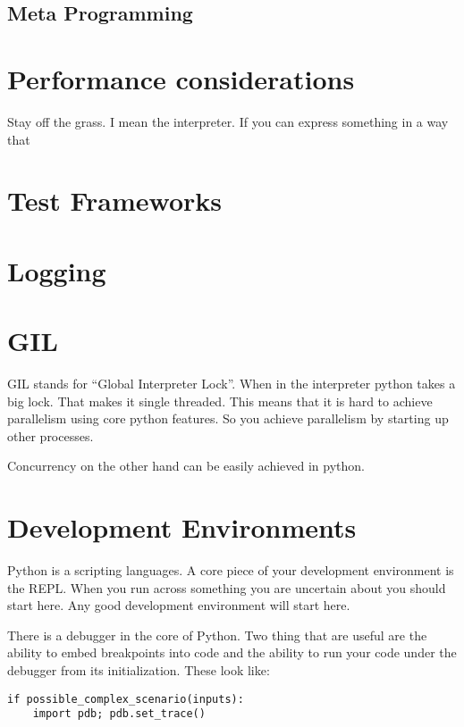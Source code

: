 \documentclass[]{article}
\begin{document}
\subsection{Meta Programming}

\section{Performance considerations}

Stay off the grass. I mean the interpreter. If you can express
something in a way that

\section{Test Frameworks}

\section{Logging}

\section{GIL}

GIL stands for ``Global Interpreter Lock''. When in the interpreter
python takes a big lock. That makes it single threaded. This means
that it is hard to achieve parallelism using core python features. So
you achieve parallelism by starting up other processes.

Concurrency on the other hand can be easily achieved in python.

\section{Development Environments}

Python is a scripting languages. A core piece of your development
environment is the REPL. When you run across something you are
uncertain about you should start here. Any good development environment
will start here.

There is a debugger in the core of Python. Two thing that are useful
are the ability to embed breakpoints into code and the ability to run
your code under the debugger from its initialization. These look like:

\begin{verbatim}
if possible_complex_scenario(inputs):
    import pdb; pdb.set_trace()
\end{verbatim}
\end{document}
